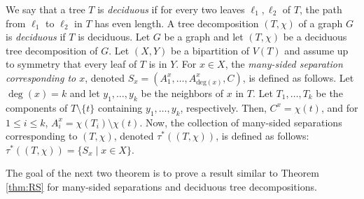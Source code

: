 \documentclass[12pt]{amsart}
\begin{document}
We say that a tree $T$ is {\em deciduous} if for every two leaves $\ell_1, \ell_2$ of $T$, the path from $\ell_1$ to $\ell_2$ in $T$ has even length. A tree decomposition $(T, \chi)$ of a graph $G$ is {\em deciduous} if $T$ is deciduous. Let $G$ be a graph and let $(T, \chi)$ be a deciduous tree decomposition of $G$. Let $(X, Y)$ be a bipartition of $V(T)$ and assume up to symmetry that every leaf of $T$ is in $Y$. For $x \in X$, the {\em many-sided separation corresponding to $x$}, denoted $S_x = (A_1^x, \hdots, A_{\text{deg}(x)}^x, C)$, is defined as follows. Let $\deg(x) = k$ and let $y_1, \hdots, y_k$ be the neighbors of $x$ in $T$. Let $T_1, \hdots, T_k$ be the components of $T \setminus \{t\}$ containing $y_1, \hdots, y_k$, respectively. Then, $C^x = \chi(t)$, and for $1 \leq i \leq k$, $A_i^x = \chi(T_i) \setminus \chi(t)$. Now, the collection of many-sided separations corresponding to $(T, \chi)$, denoted $\tau^*((T, \chi))$, is defined as follows: $\tau^*((T, \chi)) = \{S_x \mid x \in X\}$. 

The goal of the next two theorem is to prove a result similar to Theorem \ref{thm:RS} for many-sided separations and deciduous tree decompositions. 

\end{document}
